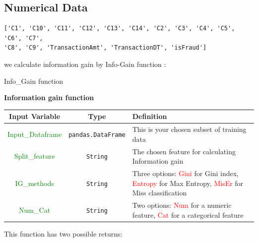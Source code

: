 \documentclass{article}
\begin{document}
\subsection{Numerical Data}
\begin{verbatim}
['C1', 'C10', 'C11', 'C12', 'C13', 'C14', 'C2', 'C3', 'C4', 'C5', 'C6', 'C7', 
'C8', 'C9', 'TransactionAmt', 'TransactionDT', 'isFraud']
\end{verbatim}

we calculate information gain by Info-Gain function :

\begin{algorithm}[H]
\SetAlgoLined
{}



\caption{Info\_Gain function}
\end{algorithm}

\textbf{Information gain function}

\begin{center}
\begin{tabular}{|c|c|p{7cm}|}
\hline
\textbf{Input Variable} & \textbf{Type} & \textbf{Definition} \\
\hline
\textcolor{green}{Input\_Dataframe} & \texttt{pandas.DataFrame} & This is your chosen subset of training data \\
\textcolor{green}{Split\_feature} & \texttt{String} & The chosen feature for calculating Information gain \\
\textcolor{green}{IG\_methods} & \texttt{String} & Three options: \textcolor{red}{Gini} for Gini index, \textcolor{red}{Entropy} for Max Entropy, \textcolor{red}{MisEr} for Miss classification\\
\textcolor{green}{Num\_Cat} & \texttt{String} & Two options: \textcolor{red}{Num} for a numeric feature, \textcolor{red}{Cat} for a categorical feature \\
\hline
\end{tabular}
\end{center}

This function has two possible returns: 
\end{document}
